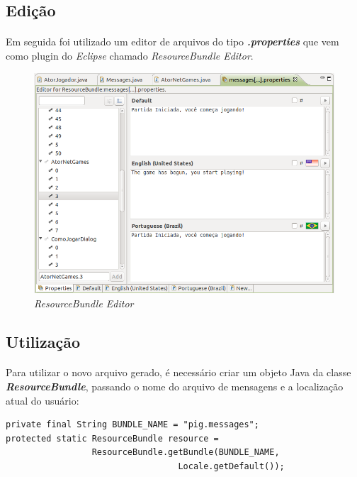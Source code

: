 \documentclass[a4paper, 12pt]{article}
\begin{document}
\FloatBarrier
\subsection{Edição} \label{edition}

\paragraph{} Em seguida foi utilizado um editor de arquivos do tipo
{\bf \emph{.properties}} que vem como plugin do \emph{Eclipse} chamado
\emph{ResourceBundle Editor}.

\begin{figure}[h!]
\centering
\includegraphics[width=\textwidth]{Screenshot-rbeditor.png}
\caption{\emph{ResourceBundle Editor}}
\end{figure}

\FloatBarrier
\subsection{Utilização} \label{use}

\paragraph{} Para utilizar o novo arquivo gerado, é necessário criar
um objeto Java da classe {\bf \emph{ResourceBundle}}, passando o nome
do arquivo de mensagens e a localização atual do usuário:

\begin{lstlisting}[frame=single, caption={Criando ResourceBundle},
  captionpos=b]
private final String BUNDLE_NAME = "pig.messages";
protected static ResourceBundle resource =
                 ResourceBundle.getBundle(BUNDLE_NAME,
                                  Locale.getDefault());
\end{lstlisting}
\end{document}
